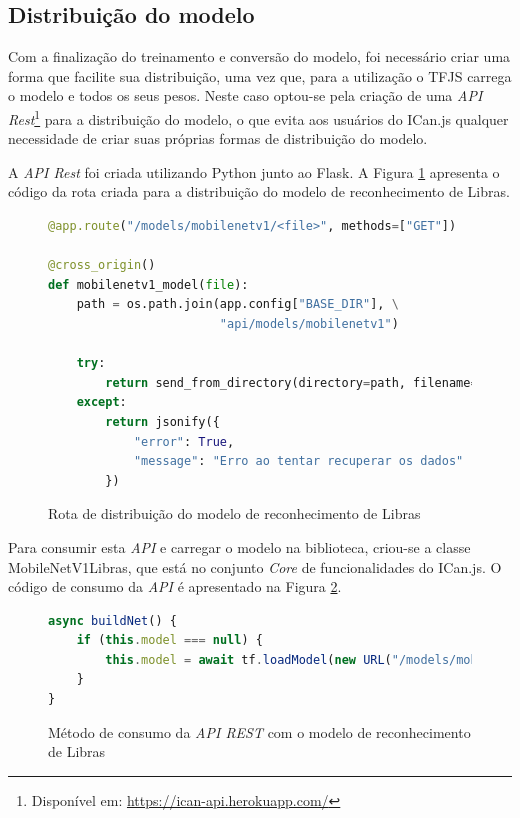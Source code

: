 \subsection{Distribuição do modelo}

\par Com a finalização do treinamento e conversão do modelo, foi necessário criar uma forma que facilite sua distribuição, uma vez que, para a utilização o TFJS carrega o modelo e todos os seus pesos. Neste caso optou-se pela criação de uma \textit{API Rest}\footnote{Disponível em: \url{https://ican-api.herokuapp.com/}} para a distribuição do modelo, o que evita aos usuários do ICan.js qualquer necessidade de criar suas próprias formas de distribuição do modelo.

\par A \textit{API Rest} foi criada utilizando Python junto ao Flask. A Figura \ref{figure:exemplo_rota_flask} apresenta o código da rota criada para a distribuição do modelo de reconhecimento de Libras.

\begin{figure}[H]
    \centering
    \caption{Rota de distribuição do modelo de reconhecimento de Libras}
    \begin{lstlisting}[language=Python]
@app.route("/models/mobilenetv1/<file>", methods=["GET"])

@cross_origin()
def mobilenetv1_model(file):
    path = os.path.join(app.config["BASE_DIR"], \
                        "api/models/mobilenetv1")

    try:
        return send_from_directory(directory=path, filename=file)
    except:
        return jsonify({
            "error": True,
            "message": "Erro ao tentar recuperar os dados"
        })
    \end{lstlisting}
    \label{figure:exemplo_rota_flask}
\end{figure}

\par Para consumir esta \textit{API} e carregar o modelo na biblioteca, criou-se a classe MobileNetV1Libras, que está no conjunto \textit{Core} de funcionalidades do ICan.js. O código de consumo da \textit{API} é apresentado na Figura \ref{figure:exemplo_consome_api}.

\begin{figure}[H]
    \centering
    \caption{Método de consumo da \textit{API REST} com o modelo de reconhecimento de Libras}
    \begin{lstlisting}[language=Javascript]
async buildNet() {
    if (this.model === null) {
        this.model = await tf.loadModel(new URL("/models/mobilenetv1/model.json", MODEL_URL).href);
    }
}
    \end{lstlisting}
    \label{figure:exemplo_consome_api}
\end{figure}

